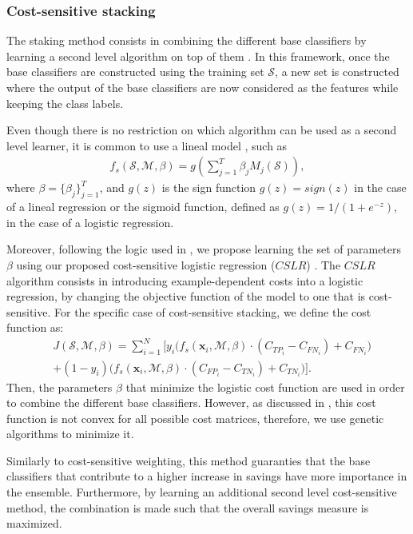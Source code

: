 {\subsubsection{Cost-sensitive stacking}
\label{sec:9:staking}

The staking method consists in combining the different base classifiers by learning a 
second level algorithm on top of them \citep{Wolpert1992}. In this framework, once the base 
classifiers are constructed using the training set  $\mathcal{S}$, a new set is constructed 
where the output of the base classifiers  are now considered as the features while keeping the 
class labels.

Even though there is no restriction on which algorithm can be used as a second level learner, 
it is common to use a lineal model \citep{Zhou2012}, such as 
\begin{align}
  f_s(\mathcal{S},\mathcal{M},\beta) =
  g \left( \sum_{j=1}^T \beta_j M_j(\mathcal{S}) \right),
\end{align}
where $\beta=\{\beta_j\}_{j=1}^T$, and $g(z)$ is the sign function 
\mbox{$g(z)=sign(z)$} in the case of a lineal regression or the sigmoid function, defined 
as \mbox{$g(z)=1/(1+e^{-z})$}, in the case of a logistic regression. 

Moreover, following the logic used in \citep{Nesbitt2010}, we propose learning the set of  
parameters $\beta$  using our proposed cost-sensitive logistic regression ($CSLR$) 
\citep{CorreaBahnsen2014b}. The $CSLR$ algorithm consists in introducing example-dependent costs 
into a logistic regression, by changing the objective function of the model to one that is 
cost-sensitive. For the specific case of cost-sensitive stacking, we define the cost function as: 
\begin{align}
  &J(\mathcal{S},\mathcal{M},\beta)= 
  \sum_{i=1}^{N} \bigg[ y_i\bigg( 
  f_s(\mathbf{x}_i,\mathcal{M},\beta) \cdot(C_{TP_i} - C_{FN_i}) + C_{FN_i} \bigg) 
  \nonumber \\
  & + (1-y_i)\bigg( f_s(\mathbf{x}_i,\mathcal{M},\beta) \cdot(C_{FP_i} - C_{TN_i}) 
    +C_{TN_i} \bigg) \bigg].
\end{align}
Then, the parameters $\beta$ that minimize the logistic cost function are used in order to 
combine the different base classifiers. However, as discussed in \citep{CorreaBahnsen2014b}, 
this cost function is not convex for all possible cost matrices, therefore, we use genetic 
algorithms to minimize it.

Similarly to cost-sensitive weighting, this method guaranties that the base classifiers that 
contribute to a higher increase in savings have more importance in the ensemble. Furthermore, 
by learning an additional second level cost-sensitive method, the combination is made such that 
the overall   savings measure is maximized.


}
